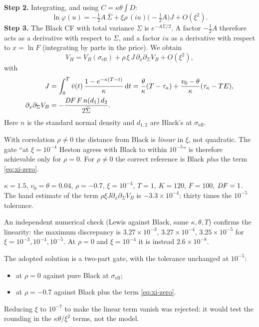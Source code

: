 \textbf{Step 2.} Integrating, and using $C=\kappa\theta\int D$:
\[
\ln\varphi(u)=-\tfrac12A\,\bar\Sigma+\xi\rho\,(iu)\big(-\tfrac12A\big)J+O(\xi^2).
\]
\textbf{Step 3.} The Black CF with total variance $\Sigma$ is $e^{-A\Sigma/2}$. A factor $-\tfrac12A$ therefore acts as
a derivative with respect to $\Sigma$, and a factor $iu$ as a derivative with respect to $x=\ln F$ (integrating by
parts in the price). We obtain
\begin{equation}\label{eq:xi-zero}
V_H=V_B(\sigma_{\text{eff}})+\rho\,\xi\,J\,\partial_x\partial_\Sigma V_B+O(\xi^2),
\end{equation}
with
\begin{align}
J&=\int_0^T\bar v(t)\,\frac{1-e^{-\kappa(T-t)}}{\kappa}\mathop{}\!\mathrm{d} t
=\frac{\theta}{\kappa}(T-\tau_\kappa)+\frac{v_0-\theta}{\kappa}(\tau_\kappa-TE),\label{eq:J}\\
\partial_x\partial_\Sigma V_B&=-\frac{\mathit{DF}\,F\,n(d_1)\,d_2}{2\bar\Sigma}.\nonumber
\end{align}
Here $n$ is the standard normal density and $d_{1,2}$ are Black's at $\sigma_{\text{eff}}$.

\begin{idea}
With correlation $\rho\ne0$ the distance from Black is \emph{linear} in $\xi$, not quadratic. The gate ``at
$\xi=10^{-4}$ Heston agrees with Black to within $10^{-5}$'' is therefore achievable only for $\rho=0$. For $\rho\ne0$
the correct reference is Black \emph{plus} the term \eqref{eq:xi-zero}.
\end{idea}

\begin{esempio}[title={Example: how large the correction is}]
$\kappa=1.5$, $v_0=\theta=0.04$, $\rho=-0.7$, $\xi=10^{-4}$, $T=1$, $K=120$, $F=100$, $\mathit{DF}=1$. The hand estimate of
the term $\rho\xi J\partial_x\partial_\Sigma V_B$ is $-{3.3\times10^{-4}}$: thirty times the $10^{-5}$ tolerance.

An independent numerical check (Lewis against Black, same $\kappa,\theta,T$) confirms the linearity: the maximum
discrepancy is ${3.27\times10^{-3}}$, ${3.27\times10^{-4}}$, ${3.25\times10^{-5}}$ for $\xi=10^{-3},10^{-4},10^{-5}$. At
$\rho=0$ and $\xi=10^{-4}$ it is instead ${2.6\times10^{-8}}$.
\end{esempio}

The adopted solution is a two-part gate, with the tolerance unchanged at $10^{-5}$:
\begin{itemize}
\item at $\rho=0$ against pure Black at $\sigma_{\text{eff}}$;
\item at $\rho=-0.7$ against Black plus the term \eqref{eq:xi-zero}.
\end{itemize}
Reducing $\xi$ to $10^{-7}$ to make the linear term vanish was rejected: it would test the rounding in the
$\kappa\theta/\xi^2$ terms, not the model.

